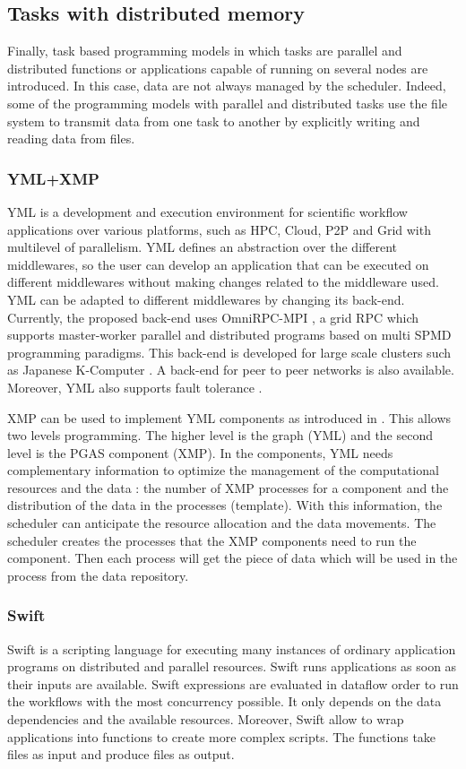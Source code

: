 \subsection{Tasks with distributed memory}
Finally, task based programming models in which tasks are parallel and distributed functions or applications capable of running on several nodes are introduced.
In this case, data are not always managed by the scheduler.
Indeed, some of the programming models with parallel and distributed tasks use the file system to transmit data from one task to another by explicitly writing and reading data from files.

\subsubsection{YML+XMP}
YML \cite{DelEP2006} is a development and execution environment for scientific workflow applications over various platforms, such as HPC, Cloud, P2P and Grid with multilevel of parallelism.
YML defines an abstraction over the different middlewares, so the user can develop an application that can be executed on different middlewares without making changes related to the middleware used.
YML can be adapted to different middlewares by changing its back-end.
Currently, the proposed back-end \cite{TsSHP2013} uses OmniRPC-MPI \cite{SaHTS2001}, a grid RPC which supports master-worker parallel and distributed programs based on multi SPMD programming paradigms.
This back-end is developed for large scale clusters such as Japanese K-Computer \cite{TsSHP2013}.
A back-end for peer to peer networks is also available.
Moreover, YML also supports fault tolerance \cite{TsuPS2015}.

XMP can be used to implement YML components as introduced in \cite{TsSHP2013}.
This allows two levels programming.
The higher level is the graph (YML) and the second level is the PGAS component (XMP).
In the components, YML needs complementary information to optimize the management of the computational resources and the data : the number of XMP processes for a component and the distribution of the data in the processes (template).
With this information, the scheduler can anticipate the resource allocation and the data movements.
The scheduler creates the processes that the XMP components need to run the component.
Then each process will get the piece of data which will be used in the process from the data repository.

\subsubsection{Swift}
Swift \cite{ZHCFL2007} \cite{WHWCK2011} is a scripting language for executing many instances of ordinary application programs on distributed and parallel resources.
Swift runs applications as soon as their inputs are available.
Swift expressions are evaluated in dataflow order to run the workflows with the most concurrency possible.
It only depends on the data dependencies and the available resources.
Moreover, Swift allow to wrap applications into functions to create more complex scripts.
The functions take files as input and produce files as output.

